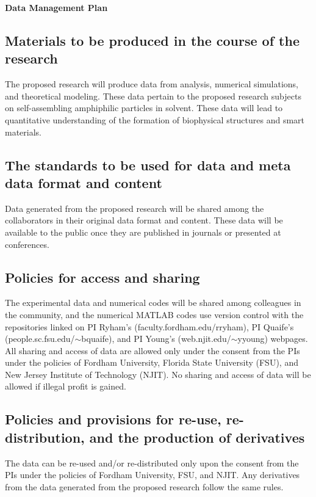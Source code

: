 \documentclass[11pt]{article}
\begin{document}
\sloppy

\begin{center}
\Large \bf Data Management Plan
\end{center}

\subsection*{Materials to be produced in the course of the research}
The proposed research will produce data from analysis, numerical
simulations, and theoretical modeling. These data pertain to the
proposed research subjects on self-assembling amphiphilic particles in
solvent. These data will lead to quantitative understanding of the
formation of biophysical structures and smart materials.

\subsection*{The standards to be used for data and meta data format and
content}
Data generated from the proposed research will be shared among the
collaborators in their original data format and content. These data will
be available to the public once they are published in journals or
presented at conferences.

\subsection*{Policies for access and sharing}
The experimental data and numerical codes will be shared among
colleagues in the community, and the numerical MATLAB codes use version
control with the repositories linked on PI Ryham's
(faculty.fordham.edu/rryham), PI Quaife's
(people.sc.fsu.edu/$\sim$bquaife), and PI Young's
(web.njit.edu/$\sim$yyoung) webpages. All sharing and access of data are
allowed only under the consent from the PIs under the policies of
Fordham University, Florida State University (FSU), and New Jersey
Institute of Technology (NJIT). No sharing and access of data will be
allowed if illegal profit is gained.

\subsection*{Policies and provisions for re-use, re-distribution, and
the production of derivatives}
The data can be re-used and/or re-distributed only upon the consent from
the PIs under the policies of Fordham University, FSU, and NJIT. Any
derivatives from the data generated from the proposed research follow
the same rules.
\end{document}
